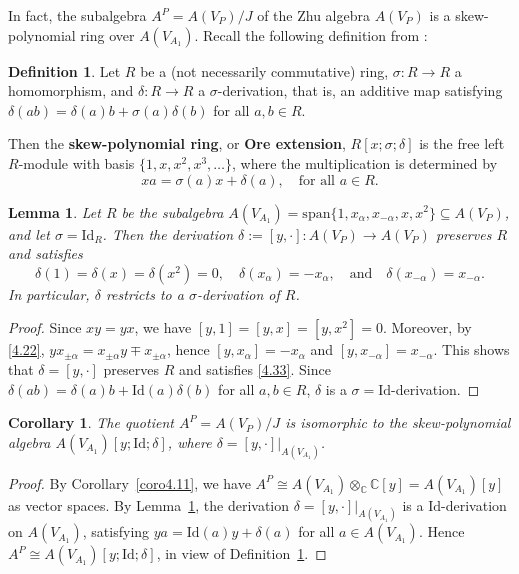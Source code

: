 \documentclass[12pt,a4paper,reqno]{amsart}
\numberwithin{equation}{section}
\numberwithin{equation}{section}
\newtheorem{lm}[thm]{Lemma}
\newtheorem{coro}[thm]{Corollary}
\theoremstyle{definition}
\newtheorem{df}[thm]{Definition}
\def \C {\mathbb{C}}
\def \al{\alpha}
\def\Id{\mathrm{Id}}
\def\spn{\mathrm{span}}
\begin{document}
	In fact, the subalgebra $A^P=A(V_P)/J$ of the Zhu algebra $A(V_P)$ is a skew-polynomial ring over $A(V_{A_1})$. Recall the following definition from \cite{GW04}: 
	
	\begin{df}\label{df4.13}
		Let $R$ be a (not necessarily commutative) ring, $\sigma:R\to R$ a homomorphism, and $\delta:R\to R$ a $\sigma$-derivation, that is, an additive map satisfying $\delta(ab)=\delta(a)b+\sigma(a)\delta(b)$ for all $a,b\in R$. 
		
		Then the {\bf skew-polynomial ring}, or {\bf Ore extension}, $R[x; \sigma;\delta]$ \cite{O33} is the free left $R$-module with basis $\{ 1,x,x^2,x^3,\dots\}$, where the multiplication is determined by 
		\[
		xa=\sigma(a)x+\delta(a), \quad \text{for all } a\in R. 
		\]
	\end{df} 
	
	\begin{lm}\label{lm4.14}
		Let $R$ be the subalgebra $A(V_{A_1})=\spn\{ 1,x_{\al},x_{-\al}, x,x^2\}\subseteq A(V_P)$, and let $\sigma=\Id_R$. Then the derivation $\delta:=[y,\cdot]: A(V_P)\to A(V_P)$ preserves $R$ and satisfies 
		\begin{equation}\label{4.33}
			\delta(1)=\delta(x)=\delta(x^2)=0,\quad \delta(x_\al)=-x_{\al},\quad \text{and}\quad \delta(x_{-\al})=x_{-\al}.
		\end{equation}
		In particular, $\delta$ restricts to a $\sigma$-derivation of $R$. 
	\end{lm}
	
	\begin{proof}
		Since $xy=yx$, we have $[y,1]=[y,x]=[y,x^2]=0$. Moreover, by \eqref{4.22}, $yx_{\pm \al}=x_{\pm \al}y\mp x_{\pm \al}$, hence $[y,x_{\al}]=-x_{\al}$ and $[y,x_{-\al}]=x_{-\al}$. This shows that $\delta=[y,\cdot]$ preserves $R$ and satisfies \eqref{4.33}. Since $\delta(ab)=\delta(a)b+\Id(a)\delta(b)$ for all $a,b\in R$, $\delta$ is a $\sigma=\Id$-derivation. 
	\end{proof}
	
	\begin{coro}\label{coro4.15}
		The quotient $A^P=A(V_P)/J$ is isomorphic to the skew-polynomial algebra $A(V_{A_1})[y; \Id;\delta]$, where $\delta=[y,\cdot]|_{A(V_{A_1})}$. 
	\end{coro}
	
	\begin{proof}
		By Corollary~\ref{coro4.11}, we have $A^P\cong A(V_{A_1})\otimes_{\C} \C[y]=A(V_{A_1})[y]$ as vector spaces. By Lemma~\ref{lm4.14}, the derivation $\delta=[y,\cdot]|_{A(V_{A_1})}$ is a $\Id$-derivation on $A(V_{A_1})$, satisfying $ya=\Id(a)y+\delta(a)$ for all $a\in A(V_{A_1})$. Hence $A^P\cong A(V_{A_1})[y; \Id;\delta]$, in view of Definition~\ref{df4.13}. 
	\end{proof}
	
\end{document}
